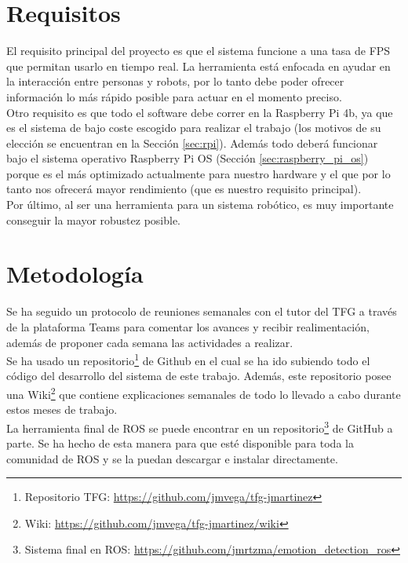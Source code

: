 \section{Requisitos}
\label{sec:requisitos}

El requisito principal del proyecto es que el sistema funcione a una tasa de FPS que permitan usarlo en tiempo real. La herramienta está enfocada en ayudar en la interacción entre personas y robots, por lo tanto debe poder ofrecer información lo más rápido posible para actuar en el momento preciso.\\

Otro requisito es que todo el software debe correr en la Raspberry Pi 4b, ya que es el sistema de bajo coste escogido para realizar el trabajo (los motivos de su elección se encuentran en la Sección \ref{sec:rpi}). Además todo deberá funcionar bajo el sistema operativo Raspberry Pi OS (Sección \ref{sec:raspberry_pi_os}) porque es el más optimizado actualmente para nuestro hardware y el que por lo tanto nos ofrecerá mayor rendimiento (que es nuestro requisito principal).\\

Por último, al ser una herramienta para un sistema robótico, es muy importante conseguir la mayor robustez posible.

\section{Metodología}
\label{sec:metodologia}

Se ha seguido un protocolo de reuniones semanales con el tutor del TFG a través de la plataforma Teams para comentar los avances y recibir realimentación, además de proponer cada semana las actividades a realizar.\\

Se ha usado un repositorio\footnote{Repositorio TFG: \url{https://github.com/jmvega/tfg-jmartinez}} de Github en el cual se ha ido subiendo todo el código del desarrollo del sistema de este trabajo. Además, este repositorio posee una Wiki\footnote{Wiki: \url{https://github.com/jmvega/tfg-jmartinez/wiki}} que contiene explicaciones semanales de todo lo llevado a cabo durante estos meses de trabajo.\\

La herramienta final de ROS se puede encontrar en un repositorio\footnote{Sistema final en ROS: \url{https://github.com/jmrtzma/emotion_detection_ros}} de GitHub a parte. Se ha hecho de esta manera para que esté disponible para toda la comunidad de ROS y se la puedan descargar e instalar directamente.

